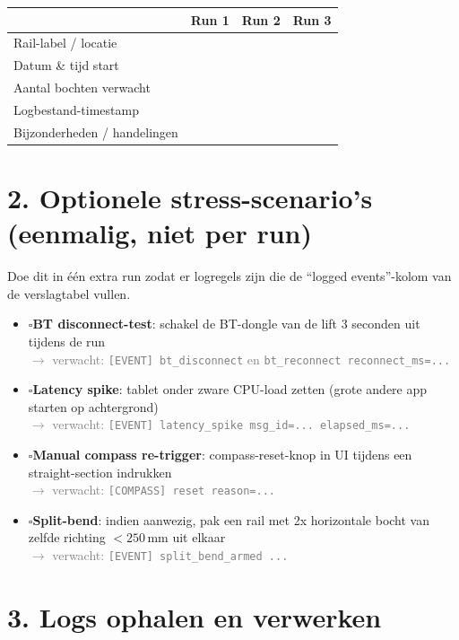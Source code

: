 \documentclass[a4paper,11pt]{article}
\newcommand{\cbox}{$\square$\hspace{0.5em}}
\begin{document}
\begin{tabularx}{\linewidth}{|l|X|X|X|}
    \hline
    & \textbf{Run 1} & \textbf{Run 2} & \textbf{Run 3} \\\hline
    Rail-label / locatie & & & \\\hline
    Datum \& tijd start  & & & \\\hline
    Aantal bochten verwacht & & & \\\hline
    Logbestand-timestamp & & & \\\hline
    Bijzonderheden / handelingen & & & \\\hline
\end{tabularx}

\section*{2. Optionele stress-scenario's (eenmalig, niet per run)}

Doe dit in één extra run zodat er logregels zijn die de ``logged events''-kolom van de verslagtabel vullen.

\begin{itemize}
    \item \cbox \textbf{BT disconnect-test}: schakel de BT-dongle van de lift 3 seconden uit tijdens de run\\
        \textcolor{gray}{\small $\rightarrow$ verwacht: \texttt{[EVENT] bt\_disconnect} en \texttt{bt\_reconnect reconnect\_ms=...}}
    \item \cbox \textbf{Latency spike}: tablet onder zware CPU-load zetten (grote andere app starten op achtergrond)\\
        \textcolor{gray}{\small $\rightarrow$ verwacht: \texttt{[EVENT] latency\_spike msg\_id=... elapsed\_ms=...}}
    \item \cbox \textbf{Manual compass re-trigger}: compass-reset-knop in UI tijdens een straight-section indrukken\\
        \textcolor{gray}{\small $\rightarrow$ verwacht: \texttt{[COMPASS] reset reason=...}}
    \item \cbox \textbf{Split-bend}: indien aanwezig, pak een rail met 2x horizontale bocht van zelfde richting $<250$\,mm uit elkaar\\
        \textcolor{gray}{\small $\rightarrow$ verwacht: \texttt{[EVENT] split\_bend\_armed ...}}
\end{itemize}

\section*{3. Logs ophalen en verwerken}
\end{document}
